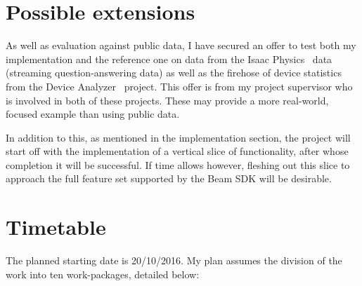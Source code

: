\section*{Possible extensions}

As well as evaluation against public data, I have secured an offer to test both my implementation and the reference one on data from the Isaac Physics~\cite{Isaac} data (streaming question-answering data) as well as the firehose of device statistics from the Device Analyzer~\cite{Device} project. This offer is from my project supervisor who is involved in both of these projects. These may provide a more real-world, focused example than using public data.

In addition to this, as mentioned in the implementation section, the project will start off with the implementation of a vertical slice of functionality, after whose completion it will be successful. If time allows however, fleshing out this slice to approach the full feature set supported by the Beam SDK will be desirable.


\section*{Timetable}

The planned starting date is 20/10/2016. My plan assumes the division of the work into ten work-packages, detailed below:

